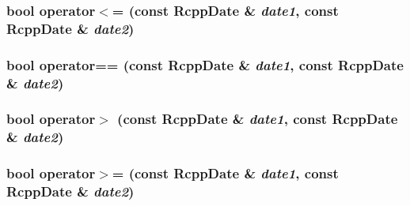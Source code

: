 \label{classRcppDate_a62c075d47528a48e5fb57c1855c4d71c}
\hypertarget{classRcppDate_a594132f5ef49b4f477d32289ced4df83}{
\subsubsection[{operator$<$=}]{\setlength{\rightskip}{0pt plus 5cm}bool operator$<$= (const {\bf RcppDate} \& {\em date1}, \/  const {\bf RcppDate} \& {\em date2})}}
\label{classRcppDate_a594132f5ef49b4f477d32289ced4df83}
\hypertarget{classRcppDate_ad6c1518c6eb9480665f532dbcc6dd2d5}{
\subsubsection[{operator==}]{\setlength{\rightskip}{0pt plus 5cm}bool operator== (const {\bf RcppDate} \& {\em date1}, \/  const {\bf RcppDate} \& {\em date2})}}
\label{classRcppDate_ad6c1518c6eb9480665f532dbcc6dd2d5}
\hypertarget{classRcppDate_a80164a177c098301c1d509fdab702567}{
\subsubsection[{operator$>$}]{\setlength{\rightskip}{0pt plus 5cm}bool operator$>$ (const {\bf RcppDate} \& {\em date1}, \/  const {\bf RcppDate} \& {\em date2})}}
\label{classRcppDate_a80164a177c098301c1d509fdab702567}
\hypertarget{classRcppDate_af7a217e1f5d4a91e2d86fc4da858a6c2}{
\subsubsection[{operator$>$=}]{\setlength{\rightskip}{0pt plus 5cm}bool operator$>$= (const {\bf RcppDate} \& {\em date1}, \/  const {\bf RcppDate} \& {\em date2})}}
\label{classRcppDate_af7a217e1f5d4a91e2d86fc4da858a6c2}


